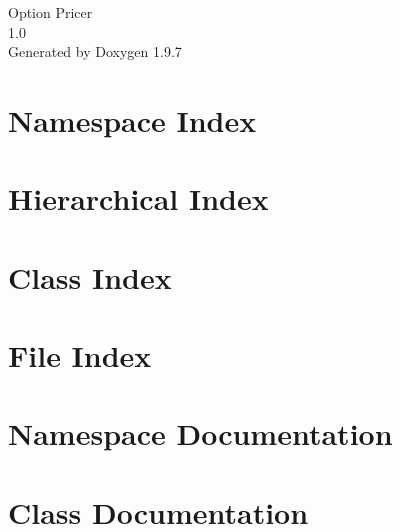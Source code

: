 \documentclass[twoside]{book}
\newcommand{\+}{\discretionary{\mbox{\scriptsize$\hookleftarrow$}}{}{}}
\newcommand{\clearemptydoublepage}{%
    \newpage{\pagestyle{empty}\cleardoublepage}%
  }
\begin{document}
  \raggedbottom
    \hypersetup{pageanchor=false,
                bookmarksnumbered=true,
                pdfencoding=unicode
               }
  \begin{titlepage}
  \vspace*{7cm}
  \begin{center}%
  {\Large Option Pricer}\\
  [1ex]\large 1.\+0 \\
  \vspace*{1cm}
  {\large Generated by Doxygen 1.9.7}\\
  \end{center}
  \end{titlepage}
  \clearemptydoublepage
  \tableofcontents
  \clearemptydoublepage
  \hypersetup{pageanchor=true}

\chapter{Namespace Index}

\chapter{Hierarchical Index}

\chapter{Class Index}

\chapter{File Index}

\chapter{Namespace Documentation}


\chapter{Class Documentation}











\end{document}
